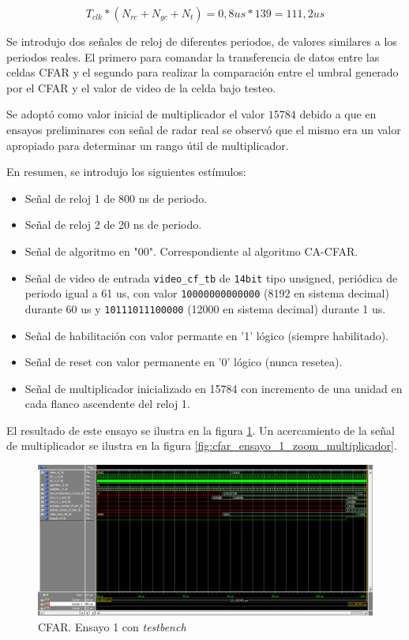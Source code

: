 \begin{equation}
T_{clk} *(N_{rc} + N_{gc} + N_t) =  0,8 us * 139 = 111,2 us
\label{Eq:delay_cfar}
\end{equation}



Se introdujo dos señales de reloj de diferentes periodos, de valores similares a los periodos reales. El primero para comandar la transferencia de datos entre las celdas CFAR y el segundo para realizar la comparación entre el umbral generado por el CFAR y el valor de video de la celda bajo testeo.

Se adoptó como valor inicial de multiplicador el valor $15784$ debido a que en ensayos preliminares con señal de radar real se observó que el mismo era un valor apropiado para determinar un rango útil de multiplicador.

En resumen, se introdujo los siguientes estímulos:
\begin{itemize}
\item Señal de reloj 1 de 800 ns de periodo.
\item Señal de reloj 2 de 20 ns de periodo.
\item Señal de algoritmo en "00". Correspondiente al algoritmo CA-CFAR.
\item Señal de video de entrada \texttt{video\_cf\_tb} de \texttt{14\-bit} tipo unsigned, periódica de periodo igual a 61 us, con valor \texttt{10000000000000} (8192 en sistema decimal) durante 60 us y \texttt{10111011100000} (12000 en sistema decimal) durante 1 us.
\item Señal de habilitación con valor permante en '1' lógico (siempre habilitado).
\item Señal de reset con valor permanente en '0' lógico (nunca resetea).
\item Señal de multiplicador inicializado en 15784 con incremento de una unidad en cada flanco ascendente del reloj 1.
\end{itemize}

El resultado de este ensayo se ilustra en la figura \ref{fig:cfar_ensayo_1}. Un acercamiento de la señal de multiplicador se ilustra en la figura \ref{fig:cfar_ensayo_1_zoom_multiplicador}.

\begin{figure}
\centering
\includegraphics[scale=0.52, angle=270]{./Figures/cfar_ensayo_1.png}
\caption{CFAR. Ensayo 1 con \textit{testbench}}
\label{fig:cfar_ensayo_1}
\end{figure}

